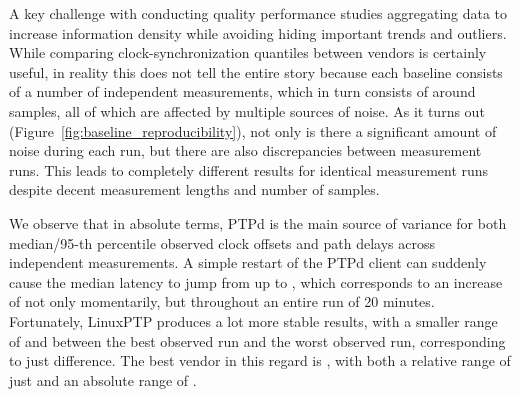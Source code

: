 {
\renewcommand{\ptpKeyPrefix}{/reproducibility/rpi-4}



\newcommand{\numBaselineMeasurements}{10}
\newcommand{\baselineTotalMinutesRuntime}{\numBaselineMeasurements*4*2*20}
\newcommand{\numSamplesPerRunApprox}{\fpeval{round(20*60)}}

A key challenge with conducting quality performance studies aggregating data to increase information density while avoiding hiding important trends and outliers. While comparing clock-synchronization quantiles between vendors is certainly useful, in reality this does not tell the entire story because each baseline consists of a number of independent measurements, which in turn consists of around \numSamplesPerRunApprox{} samples, all of which are affected by multiple sources of noise. As it turns out (Figure~\ref{fig:baseline_reproducibility}), not only is there a significant amount of noise during each run, but there are also discrepancies between measurement runs. This leads to completely different results for identical measurement runs despite decent measurement lengths and number of samples.

We observe that in absolute terms, PTPd is the main source of variance for both median/95-th percentile observed clock offsets and path delays across independent measurements. A simple restart of the PTPd client can suddenly cause the median latency to jump from  up to , which corresponds to an increase of  not only momentarily, but throughout an entire run of 20 minutes.
Fortunately, LinuxPTP produces a lot more stable results, with a smaller range of  and  between the best observed run and the worst observed run, corresponding to just  difference. The best vendor in this regard is \fVendor{\cmpMinArg}, with both a relative range of just \fRelative{\cmpMin} and an absolute range of .
%
%

}
